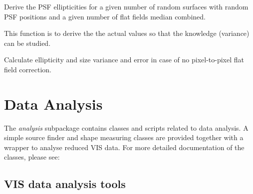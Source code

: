 \documentclass[a4paper,12pt,english]{sphinxmanual}
\begin{document}
\begin{fulllineitems}
\label{reduction:analysis.FlatfieldCalibration.testFlatCalibration}
Derive the PSF ellipticities for a given number of random surfaces with random PSF positions
and a given number of flat fields median combined.

This function is to derive the the actual values so that the knowledge (variance) can be studied.

\end{fulllineitems}


\begin{fulllineitems}
\label{reduction:analysis.FlatfieldCalibration.testNoFlatfieldingEffects}
Calculate ellipticity and size variance and error in case of no pixel-to-pixel flat field correction.

\end{fulllineitems}



\chapter{Data Analysis}
\label{index:data-analysis}
The \emph{analysis} subpackage contains classes and scripts related to data analysis. A simple source finder and shape
measuring classes are provided together with a wrapper to analyse reduced VIS data. For more detailed
documentation of the classes, please see:


\section{VIS data analysis tools}
\label{analysis::doc}\label{analysis:module-analysis.analyse}\label{analysis:vis-data-analysis-tools}
\end{document}
